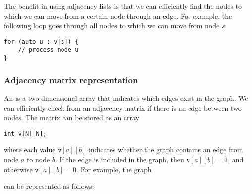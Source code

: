The benefit in using adjacency lists is that
we can efficiently find the nodes to which
we can move from a certain node through an edge.
For example, the following loop goes through all nodes
to which we can move from node $s$:

\begin{lstlisting}
for (auto u : v[s]) {
    // process node u
}
\end{lstlisting}

\subsubsection{Adjacency matrix representation}


An  is a two-dimensional array
that indicates which edges exist in the graph.
We can efficiently check from an adjacency matrix
if there is an edge between two nodes.
The matrix can be stored as an array
\begin{lstlisting}
int v[N][N];
\end{lstlisting}
where each value $\texttt{v}[a][b]$ indicates
whether the graph contains an edge from
node $a$ to node $b$.
If the edge is included in the graph,
then $\texttt{v}[a][b]=1$,
and otherwise $\texttt{v}[a][b]=0$.
For example, the graph
\begin{center}
\end{center}
can be represented as follows:
\begin{center}
\end{center}

